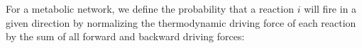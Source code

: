 For a metabolic network, we define the probability that a reaction $i$ will fire in a given direction by normalizing the thermodynamic driving force of each reaction by the sum of all forward and backward driving forces:
